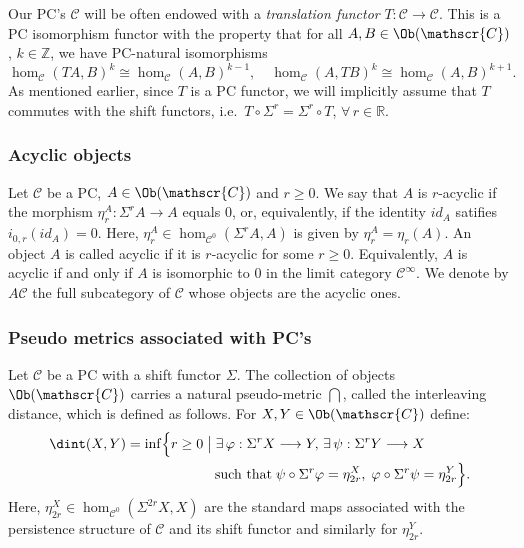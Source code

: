 Our PC's $\mathscr{C}$ will be often endowed with a {\em translation
  functor} $T: \mathscr{C} \longrightarrow \mathscr{C}$. This is a PC
isomorphism functor with the property that for all
$A, B \in \Ob(\mathscr{C})$, $k \in \mathbb{Z}$, we have PC-natural
isomorphisms
$$\hom_{\mathscr{C}}(TA,B)^k \cong \hom_{\mathscr{C}}(A,B)^{k-1},
\quad \hom_{\mathscr{C}}(A,TB)^k \cong
\hom_{\mathscr{C}}(A,B)^{k+1}.$$ As mentioned earlier, since $T$ is a
PC functor, we will implicitly assume that $T$ commutes with the shift
functors, i.e.~$T \circ \Sigma^{r} = \Sigma^r \circ T$,
$\forall \, r \in \mathbb{R}$.




\subsubsection{Acyclic objects} \label{sbsb:acyclic} Let $\mathscr{C}$
be a PC, $A \in \Ob(\mathscr{C})$ and $r \geq 0$. We say that $A$ is
$r$-acyclic if the morphism $\eta_r^A: \Sigma^r A \longrightarrow A$
equals $0$, or, equivalently, if the identity $id_{A}$ satifies
$i_{0,r}(id_{A})=0$.  Here,
$\eta^A_{r} \in \hom_{\mathscr{C}^0}(\Sigma^{r}A, A)$ is given by
$\eta^{A}_{r}=\eta_{r}(A)$. An object $A$ is called acyclic if it is
$r$-acyclic for some $r \geq 0$. Equivalently, $A$ is acyclic if and
only if $A$ is isomorphic to $0$ in the limit category
$\mathscr{C}^{\infty}$.  We denote by $A\mathscr{C}$ the full
subcategory of $\mathscr{C}$ whose objects are the acyclic ones.


\subsubsection{Pseudo metrics associated with
  PC's} \label{sbsb:pc-metrics}

Let $\mathscr{C}$ be a PC with a shift functor $\Sigma$. The
collection of objects $\Ob(\mathscr{C})$ carries a natural pseudo-metric
$\dint$, called the interleaving distance, which is defined as
follows.  For $X, Y \in \Ob(\mathscr{C})$ define:
\begin{equation} \label{eq:d-int}
  \begin{aligned}
    \dint(X, Y) = \inf \Bigl\{r \geq 0 & \bigm| \exists \, \varphi:
    \Sigma^rX \longrightarrow Y, \, \exists \, \psi: \Sigma^rY
    \longrightarrow X \\
    & \;\;\; \text{such that} \; \psi \circ \Sigma^r \varphi =
    \eta_{2r}^X, \; \varphi \circ \Sigma^r \psi = \eta_{2r}^Y \Bigr\}.
  \end{aligned}
\end{equation}
Here, $\eta^X_{2r} \in \hom_{\mathscr{C}^0}(\Sigma^{2r}X, X)$ are the
standard maps associated with the persistence structure of
$\mathscr{C}$ and its shift functor and similarly for $\eta^Y_{2r}$.

